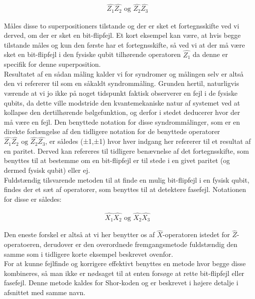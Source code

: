 \documentclass[a4paper,oneside,article]{memoir}
\begin{document}
\begin{align*}
    \hat{Z_1} \hat{Z_2} \textrm{ og } \hat{Z_2} \hat{Z_3}
\end{align*}

Måles disse to superpositioners tilstande og der er sket et fortegnsskifte ved vi derved, om der er sket en bit-flipfejl. Et kort eksempel kan være, at hvis begge tilstande måles og kun den første har et fortegnsskifte, så ved vi at der må være sket en bit-flipfejl i den fysiske qubit tilhørende operatoren $\hat{Z_1}$ da denne er specifik for denne superposition. \\

Resultatet af en sådan måling kalder vi for syndromer og målingen selv er altså den vi refererer til som en såkaldt syndrommåling. Grunden hertil, naturligvis værende at vi jo ikke på noget tidspunkt faktisk observerer en fejl i de fysiske qubits, da dette ville modstride den kvantemekaniske natur af systemet ved at kollapse den dertilhørende bølgefunktion, og derfor i stedet deducerer hvor der må være en fejl. Den benyttede notation for disse syndrommålinger, som er en direkte forlængelse af den tidligere notation for de benyttede operatorer  $\hat{Z_1} \hat{Z_2} \textrm{ og } \hat{Z_2} \hat{Z_3}$, er således (±1,±1) hvor hver indgang her refererer til et resultat af en paritet. Derved kan refereres til tidligere benævnelse af det fortegnsskifte, som benyttes til at bestemme om en bit-flipfejl er til stede i en givet paritet (og dermed fysisk qubit) eller ej. \\

Fuldstændig tilsvarende metoden til at finde en mulig bit-flipfejl i en fysisk qubit, findes der et sæt af operatorer, som benyttes til at detektere fasefejl. Notationen for disse er således:

\begin{align*}
    \hat{X_1} \hat{X_2} \textrm{ og } \hat{X_2} \hat{X_3}
\end{align*}

Den eneste forskel er altså at vi her benytter os af $\hat{X}$-operatoren istedet for $\hat{Z}$-operatoeren, derudover er den overordnede fremgangsmetode fuldstændig den samme som i tidligere korte eksempel beskrevet ovenfor. \\

For at kunne fejlfinde og korrigere effektivt benyttes en metode hvor begge disse kombineres, så man ikke er nødsaget til at enten forsøge at rette bit-flipfejl eller fasefejl. Denne metode kaldes for Shor-koden og er beskrevet i højere detalje i afsnittet med samme navn. 
\end{document}
